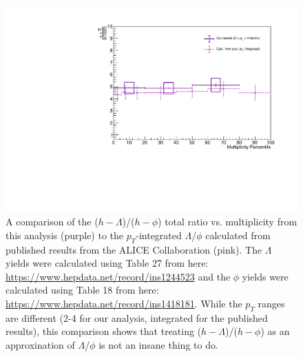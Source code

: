 \documentclass[ALICE,manyauthors]{ALICE_analysis_notes}
\begin{document}
\begin{figure}[ht]
\centering
\includegraphics[width=5in]{figures/lambda_phi_ratio_total_comparison.pdf}
\caption{A comparison of the ($h-\Lambda$)/($h-\phi$) total ratio vs. multiplicity from this analysis (purple) to the $p_{T}$-integrated $\Lambda$/$\phi$ calculated from published results from the ALICE Collaboration (pink). The $\Lambda$ yields were calculated using Table 27 from here: \url{https://www.hepdata.net/record/ins1244523} and the $\phi$ yields were calculated using Table 18 from here: \url{https://www.hepdata.net/record/ins1418181}. While the $p_{T}$ ranges are different (2-4 for our analysis, integrated for the published results), this comparison shows that treating ($h-\Lambda$)/($h-\phi$) as an approxination of $\Lambda$/$\phi$ is not an insane thing to do.}
\label{lambda_phi_ratio_published_comp}
\end{figure}


\clearpage
\end{document}
